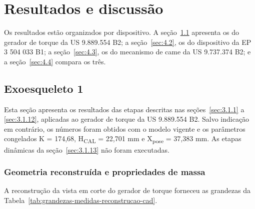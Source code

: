 
\chapter{Resultados e discussão}\label{sec:4}

Os resultados estão organizados por dispositivo. A seção~\ref{sec:4.1} apresenta os do gerador de torque da US 9.889.554 B2; a seção~\ref{sec:4.2}, os do dispositivo da EP 3 504 033 B1; a seção~\ref{sec:4.3}, os do mecanismo de came da US 9.737.374 B2; e a seção~\ref{sec:4.4} compara os três.

\section{Exoesqueleto 1}\label{sec:4.1}

Esta seção apresenta os resultados das etapas descritas nas seções~\ref{sec:3.1.1} a \ref{sec:3.1.12}, aplicadas ao gerador de torque da US 9.889.554 B2. Salvo indicação em contrário, os números foram obtidos com o modelo vigente e os parâmetros congelados K = 174,68, H\textsubscript{CAL} = 22,701 mm e X\textsubscript{pose} = 37,383 mm. As etapas dinâmicas da seção~\ref{sec:3.1.13} não foram executadas.

\subsection{Geometria reconstruída e propriedades de massa}\label{sec:4.1.1}

A reconstrução da vista em corte do gerador de torque forneceu as grandezas da Tabela~\ref{tab:grandezas-medidas-reconstrucao-cad}.

